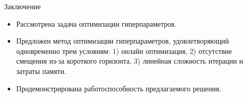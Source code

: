 \documentclass[aspectratio=169]{beamer}
\begin{document}



\begin{frame}{Заключение}
    \begin{itemize}
      \item Рассмотрена задача оптимизации гиперпараметров.
      \item Предложен метод оптимизации гиперпараметров, удовлетворяющий одновременно трем условиям:
      1) онлайн оптимизация, 2) отсутствие смещения из-за короткого горизонта, 3) линейная сложность итерации и затраты памяти.
      \item Продемонстрирована работоспособность предлагаемого решения.
    \end{itemize}
\end{frame}

\end{document}
